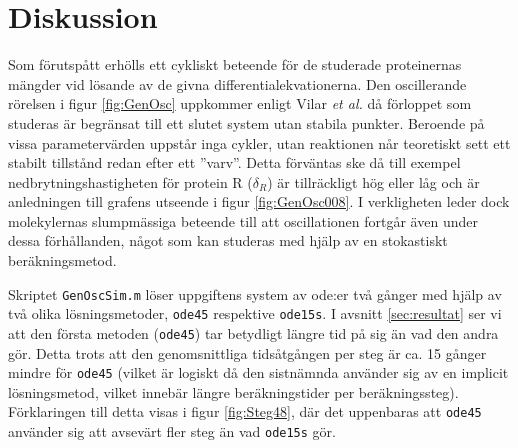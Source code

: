 \section{Diskussion}
Som förutspått erhölls ett cykliskt beteende för de studerade proteinernas mängder vid lösande av de givna differentialekvationerna. Den oscillerande rörelsen i figur \ref{fig:GenOsc} uppkommer enligt Vilar \emph{et al.} \cite{ref:rapport} då förloppet som studeras är begränsat till ett slutet system utan stabila punkter. Beroende på vissa parametervärden uppstår inga cykler, utan reaktionen når teoretiskt sett ett stabilt tillstånd redan efter ett ''varv''. Detta förväntas ske då till exempel nedbrytningshastigheten för protein R ($\delta_R$) är tillräckligt hög eller låg och är anledningen till grafens utseende i figur \ref{fig:GenOsc008}. I verkligheten leder dock molekylernas slumpmässiga beteende till att oscillationen fortgår även under dessa förhållanden, något som kan studeras med hjälp av en stokastiskt beräkningsmetod. 

Skriptet \texttt{GenOscSim.m} löser uppgiftens system av ode:er två gånger med hjälp av två olika lösningsmetoder, \texttt{ode45} respektive \texttt{ode15s}. I avsnitt \ref{sec:resultat} ser vi att den första metoden (\texttt{ode45}) tar betydligt längre tid på sig än vad den andra gör. Detta trots att den genomsnittliga tidsåtgången per steg är ca. 15 gånger mindre för \texttt{ode45} (vilket är logiskt då den sistnämnda använder sig av en implicit lösningsmetod, vilket innebär längre beräkningstider per beräkningssteg). Förklaringen till detta visas i figur \ref{fig:Steg48}, där det uppenbaras att \texttt{ode45} använder sig att avsevärt fler steg än vad \texttt{ode15s} gör.